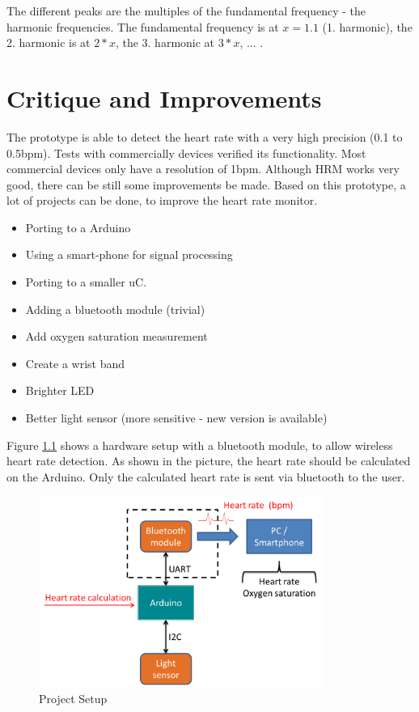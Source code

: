 \documentclass[notitlepage]{scrreprt}
\begin{document}
The different peaks are the multiples of the fundamental frequency - the harmonic frequencies. The fundamental frequency is at $x = 1.1$ (1. harmonic), the 2. harmonic is at $2*x$, the 3. harmonic at $3*x$, ... . 

\chapter{Critique and Improvements}
The prototype is able to detect the heart rate with a very high precision (0.1 to 0.5bpm). Tests with commercially devices verified its functionality. Most commercial devices only have a resolution of 1bpm. Although HRM works very good, there can be still some improvements be made. Based on this prototype, a lot of projects can be done, to improve the heart rate monitor.

\begin{itemize}
	\item{Porting to a Arduino}
	\item{Using a smart-phone for signal processing}
	\item{Porting to a smaller uC.}
	\item{Adding a bluetooth module (trivial)}
	\item{Add oxygen saturation measurement}
	\item{Create a wrist band}
	\item{Brighter LED}
	\item{Better light sensor (more sensitive - new version is available)}
\end{itemize}

Figure \ref{fig:data-flow1} shows a hardware setup with a bluetooth module, to allow wireless heart rate detection. As shown in the picture, the heart rate should be calculated on the Arduino. Only the calculated heart rate is sent via bluetooth to the user.

\begin{figure}[H]
	\centering
	\includegraphics[width=350px]{images/general_dataFlow_first.png}
	\caption{Project Setup}
	\label{fig:data-flow1}
\end{figure}
\end{document}
